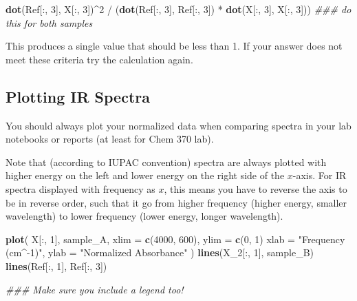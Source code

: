 \documentclass[]{tufte-book}
\newenvironment{Shaded}{}{}
\newcommand{\CommentTok}[1]{\textcolor[rgb]{0.38,0.63,0.69}{\textit{#1}}}
\newcommand{\DataTypeTok}[1]{\textcolor[rgb]{0.56,0.13,0.00}{#1}}
\newcommand{\DecValTok}[1]{\textcolor[rgb]{0.25,0.63,0.44}{#1}}
\newcommand{\KeywordTok}[1]{\textcolor[rgb]{0.00,0.44,0.13}{\textbf{#1}}}
\newcommand{\NormalTok}[1]{#1}
\newcommand{\OperatorTok}[1]{\textcolor[rgb]{0.40,0.40,0.40}{#1}}
\newcommand{\StringTok}[1]{\textcolor[rgb]{0.25,0.44,0.63}{#1}}
\begin{document}
\begin{Shaded}
\begin{Highlighting}[]
\KeywordTok{dot}\NormalTok{(Ref[}\OperatorTok{:}\NormalTok{, }\DecValTok{3}\NormalTok{], X[}\OperatorTok{:}\NormalTok{, }\DecValTok{3}\NormalTok{])}\OperatorTok{^}\DecValTok{2} \OperatorTok{/}\StringTok{ }\NormalTok{(}\KeywordTok{dot}\NormalTok{(Ref[}\OperatorTok{:}\NormalTok{, }\DecValTok{3}\NormalTok{], Ref[}\OperatorTok{:}\NormalTok{, }\DecValTok{3}\NormalTok{]) }\OperatorTok{*}\StringTok{ }\KeywordTok{dot}\NormalTok{(X[}\OperatorTok{:}\NormalTok{, }\DecValTok{3}\NormalTok{], X[}\OperatorTok{:}\NormalTok{, }\DecValTok{3}\NormalTok{]))}
\CommentTok{### do this for both samples}
\end{Highlighting}
\end{Shaded}

This produces a single value that should be less than 1. If your answer does not meet these criteria try the calculation again.

\hypertarget{plotting-ir-spectra}{%
\subsection*{Plotting IR Spectra}\label{plotting-ir-spectra}}

You should always plot your normalized data when comparing spectra in your lab notebooks or reports (at least for Chem 370 lab).

Note that (according to IUPAC convention) spectra are always plotted with higher energy on the left and lower energy on the right side of the \(x\)-axis. For IR spectra displayed with frequency as \(x\), this means you have to reverse the axis to be in reverse order, such that it go from higher frequency (higher energy, smaller wavelength) to lower frequency (lower energy, longer wavelength).

\begin{Shaded}
\begin{Highlighting}[]
\KeywordTok{plot}\NormalTok{(}
\NormalTok{  X[}\OperatorTok{:}\NormalTok{, }\DecValTok{1}\NormalTok{], sample_A, }
  \DataTypeTok{xlim =} \KeywordTok{c}\NormalTok{(}\DecValTok{4000}\NormalTok{, }\DecValTok{600}\NormalTok{), }\DataTypeTok{ylim =} \KeywordTok{c}\NormalTok{(}\DecValTok{0}\NormalTok{, }\DecValTok{1}\NormalTok{)}
  \DataTypeTok{xlab =} \StringTok{"Frequency (cm^-1)"}\NormalTok{, }\DataTypeTok{ylab =} \StringTok{"Normalized Absorbance"}
\NormalTok{)}
\KeywordTok{lines}\NormalTok{(X_}\DecValTok{2}\NormalTok{[}\OperatorTok{:}\NormalTok{, }\DecValTok{1}\NormalTok{], sample_B)}
\KeywordTok{lines}\NormalTok{(Ref[}\OperatorTok{:}\NormalTok{, }\DecValTok{1}\NormalTok{], Ref[}\OperatorTok{:}\NormalTok{, }\DecValTok{3}\NormalTok{])}

\CommentTok{### Make sure you include a legend too!}
\end{Highlighting}
\end{Shaded}
\end{document}
